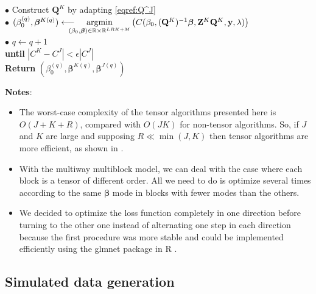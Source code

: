 \documentclass[preprint,12pt]{elsarticle}
\begin{document}
\begin{mdframed}[leftmargin=0cm, rightmargin=3.2cm]
    \phantom{a}\hspace{25 pt} $\bullet$ Construct $\mathbf{Q}^K$ by adapting \cref{eqref:Q^J}\\[2 pt]
    \phantom{a}\hspace{25 pt}  $\bullet$ $(\beta_0^{(q)}, \bm{\beta}^{K {(q)}}) \longleftarrow \hspace{-10 pt} \underset{(\beta_0, \bm{\beta}) \in \mathbb{R} \times \mathbb{R}^{LRK + M}}{\text{argmin}} \left( C(\beta_0, (\mathbf{Q}^K)^{-1}\bm{\beta},\mathbf{Z}^K \mathbf{Q}^K, \mathbf{y}, \lambda) \right)$\\[2 pt]
    \phantom{a}\hspace{25 pt}  $\bullet$ $q \leftarrow q + 1$\\[4 pt]
    \phantom{a}\hspace{8 pt}  \textbf{until} $|C^K - C^J| < \epsilon |C^J| $\\[4 pt]
    \textbf{Return} $(\beta_0^{(q)},\bm{\beta}^{K(q)}, \bm{\beta}^{J(q)})$
\end{mdframed}

\vspace{5 pt}
\noindent \textbf{Notes}:
\begin{itemize}
    \item The worst-case complexity of the tensor algorithms presented here is $O(J + K + R)$, compared with $O(JK)$ for non-tensor algorithms. So, if $J$ and $K$ are large and supposing $R \ll \min(J,K)$ then tensor algorithms are more efficient, as shown in \cite{multi_rank_r}.
    \item With the multiway multiblock model, we can deal with the case where each block is a tensor of different order. All we need to do is optimize several times according to the same $\bm{\beta}$ mode in blocks with fewer modes than the others.
    \item We decided to optimize the loss function completely in one direction before turning to the other one instead of alternating one step in each direction because the first procedure was more stable and could be implemented efficiently using the glmnet package in R \cite{glmnet}.
\end{itemize}

\vspace{7 pt}


\subsection{Simulated data generation}
\end{document}
